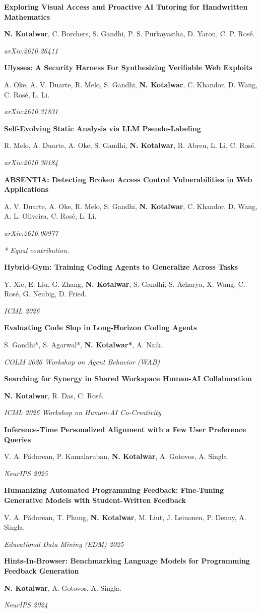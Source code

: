 \documentclass[12pt,a4paper]{article}
\newenvironment{cvsection}[1]{%
  \par\addvspace{20pt}\noindent
  \makebox[0pt][r]{\parbox[t]{26mm}{\raggedright\hyphenpenalty=10000\exhyphenpenalty=10000\fontsize{11}{14.5}\selectfont\bfseries\scshape #1}\hspace{6mm}}%
  \begin{minipage}[t]{\linewidth}\RaggedRight\ignorespaces
}{\par\unskip\end{minipage}\par}
\newenvironment{entry}{\par\noindent\begin{minipage}[t]{\linewidth}\RaggedRight}{\end{minipage}\par\vspace{9pt}}
\newcommand{\paper}[4]{\begin{entry}\textbf{#2}\par #3\par\textit{#4}\end{entry}}
\begin{document}
\newpage

\begin{cvsection}{Preprints}
\paper{https://arxiv.org/abs/2610.26411}
{Exploring Visual Access and Proactive AI Tutoring for Handwritten Mathematics}
{\textbf{N. Kotalwar}, C. Borchers, S. Gandhi, P. S. Purkayastha, D. Yaron, C. P. Ros\'{e}.}
{arXiv:2610.26411\enspace\textperiodcentered{}}
\paper{https://arxiv.org/abs/2610.31831}
{Ulysses: A Security Harness For Synthesizing Verifiable Web Exploits}
{A. Oke, A. V. Duarte, R. Melo, S. Gandhi, \textbf{N. Kotalwar}, C. Khandor, D. Wang, C. Ros\'{e}, L. Li.}
{arXiv:2610.31831\enspace\textperiodcentered{}}
\paper{https://arxiv.org/abs/2610.30184}
{Self-Evolving Static Analysis via LLM Pseudo-Labeling}
{R. Melo, A. Duarte, A. Oke, S. Gandhi, \textbf{N. Kotalwar}, R. Abreu, L. Li, C. Ros\'{e}.}
{arXiv:2610.30184\enspace\textperiodcentered{}}
\paper{https://arxiv.org/abs/2610.00977}
{ABSENTIA: Detecting Broken Access Control Vulnerabilities in Web Applications}
{A. V. Duarte, A. Oke, R. Melo, S. Gandhi, \textbf{N. Kotalwar}, C. Khandor, D. Wang, A. L. Oliveira, C. Ros\'{e}, L. Li.}
{arXiv:2610.00977\enspace\textperiodcentered\enspace 2026}
\end{cvsection}

\begin{cvsection}{Publications}
{\small\textit{* Equal contribution.}}\par\vspace{6pt}
\paper{https://arxiv.org/abs/2602.16819}
{Hybrid-Gym: Training Coding Agents to Generalize Across Tasks}
{Y. Xie, E. Liu, G. Zhang, \textbf{N. Kotalwar}, S. Gandhi, S. Acharya, X. Wang, C. Ros\'{e}, G. Neubig, D. Fried.}
{ICML 2026}
\paper{https://openreview.net/forum?id=VLgFkLRUfV}
{Evaluating Code Slop in Long-Horizon Coding Agents}
{S. Gandhi*, S. Agarwal*, \textbf{N. Kotalwar*}, A. Naik.}
{COLM 2026 Workshop on Agent Behavior (WAB)}
\paper{https://arxiv.org/abs/2606.18413}
{Searching for Synergy in Shared Workspace Human-AI Collaboration}
{\textbf{N. Kotalwar}, R. Das, C. Ros\'{e}.}
{ICML 2026 Workshop on Human-AI Co-Creativity}

\paper{https://arxiv.org/abs/2511.02966}
{Inference-Time Personalized Alignment with a Few User Preference Queries}
{V. A. P\u{a}durean, P. Kamalaruban, \textbf{N. Kotalwar}, A. Gotovos, A. Singla.}
{NeurIPS 2025}
\paper{https://educationaldatamining.org/EDM2025/proceedings/2025.EDM.short-papers.35/2025.EDM.short-papers.35.pdf}
{Humanizing Automated Programming Feedback: Fine-Tuning Generative Models with Student-Written Feedback}
{V. A. P\u{a}durean, T. Phung, \textbf{N. Kotalwar}, M. Liut, J. Leinonen, P. Denny, A. Singla.}
{Educational Data Mining (EDM) 2025}
\paper{https://arxiv.org/abs/2406.05053}
{Hints-In-Browser: Benchmarking Language Models for Programming Feedback Generation}
{\textbf{N. Kotalwar}, A. Gotovos, A. Singla.}
{NeurIPS 2024}
\end{cvsection}
\end{document}
